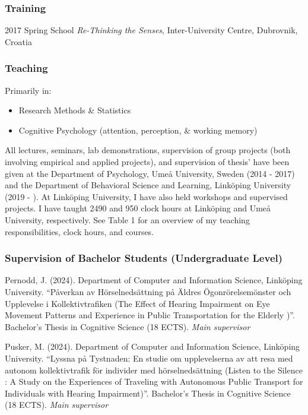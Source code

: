 \documentclass[]{article}
\providecommand{\tightlist}{%
  \setlength{\itemsep}{0pt}\setlength{\parskip}{0pt}}
\begin{document}
\subsubsection{Training}\label{training}

2017 Spring School \emph{Re-Thinking the Senses}, Inter-University
Centre, Dubrovnik, Croatia

\subsubsection{Teaching}\label{teaching}

Primarily in:

\begin{itemize}
\tightlist
\item
  Research Methods \& Statistics
\item
  Cognitive Psychology (attention, perception, \& working memory)
\end{itemize}

All lectures, seminars, lab demonstrations, supervision of group
projects (both involving empirical and applied projects), and
supervision of thesis' have been given at the Department of Psychology,
Umeå University, Sweden (2014 - 2017) and the Department of Behavioral
Science and Learning, Linköping University (2019 - ). At Linköping
University, I have also held workshops and supervised projects. I have
taught 2490 and 950 clock hours at Linköping and Umeå University,
respectively. See Table 1 for an overview of my teaching
responsibilities, clock hours, and courses.

\subsubsection{Supervision of Bachelor Students (Undergraduate
Level)}\label{supervision-of-bachelor-students-undergraduate-level}

Pernodd, J. (2024). Department of Computer and Information Science,
Linköping University. ``Påverkan av Hörselnedsättning på Äldres
Ögonrörelsemönster och Upplevelse i Kollektivtrafiken (The Effect of
Hearing Impairment on Eye Movement Patterns and Experience in Public
Transportation for the Elderly )''. Bachelor's Thesis in Cognitive
Science (18 ECTS). \emph{Main supervisor}

Pusker, M. (2024). Department of Computer and Information Science,
Linköping University. ``Lyssna på Tystnaden: En studie om upplevelserna
av att resa med autonom kollektivtrafik för individer med
hörselnedsättning (Listen to the Silence : A Study on the Experiences of
Traveling with Autonomous Public Transport for Individuals with Hearing
Impairment)''. Bachelor's Thesis in Cognitive Science (18 ECTS).
\emph{Main supervisor}
\end{document}
